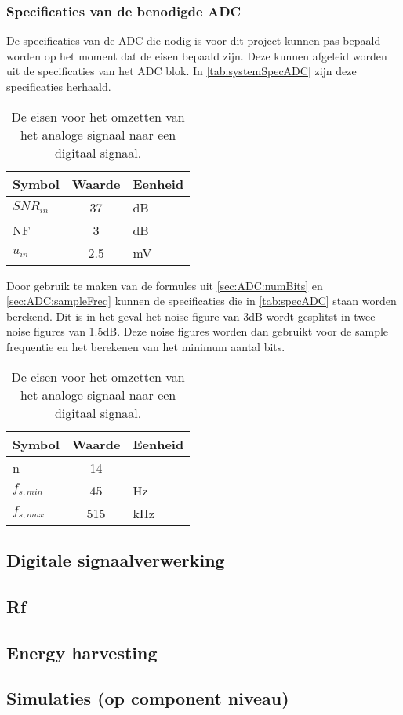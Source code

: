 \subsubsection{Specificaties van de benodigde ADC}
De specificaties van de ADC die nodig is voor dit project kunnen pas bepaald worden op het moment dat de eisen bepaald zijn. Deze kunnen afgeleid worden uit de specificaties van het ADC blok. In \autoref{tab:systemSpecADC} zijn deze specificaties herhaald.
\begin{table}[ht]
    \centering
    \begin{tabular}{l|c|l}
        Symbol      & Waarde & Eenheid\\\hline
        $SNR_{in}$  & 37        & dB\\
        NF          & 3         & dB\\
        $u_{in}$    & 2.5       & mV\\
    \end{tabular}
    \caption{De eisen voor het omzetten van het analoge signaal naar een digitaal signaal.}
    \label{tab:systemSpecADC}
\end{table}
Door gebruik te maken van de formules uit \autoref{sec:ADC:numBits} en \autoref{sec:ADC:sampleFreq} kunnen de specificaties die in \autoref{tab:specADC} staan worden berekend. Dit is in het geval het noise figure van 3dB wordt gesplitst in twee noise figures van 1.5dB. Deze noise figures worden dan gebruikt voor de sample frequentie en het berekenen van het minimum aantal bits.
\begin{table}[ht]
    \centering
    \begin{tabular}{l|c|l}
        Symbol      & Waarde    & Eenheid\\\hline
        n           & 14        & \\
        $f_{s,min}$ & 45        & Hz\\
        $f_{s,max}$ & 515       & kHz\\
    \end{tabular}
    \caption{De eisen voor het omzetten van het analoge signaal naar een digitaal signaal.}
    \label{tab:specADC}
\end{table}





\subsection{Digitale signaalverwerking}

\subsection{Rf}

\subsection{Energy harvesting}

\subsection{Simulaties (op component niveau)}
